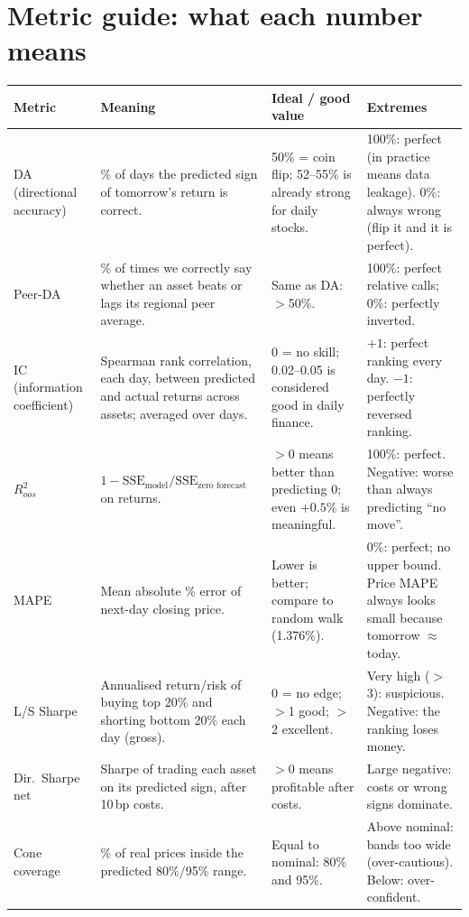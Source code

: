 \documentclass[10pt,a4paper]{article}
\begin{document}
\section{Metric guide: what each number means}
\begin{center}\footnotesize
\begin{tabularx}{\linewidth}{@{}p{2.1cm}Xp{3.0cm}X@{}}
\toprule
\textbf{Metric} & \textbf{Meaning} & \textbf{Ideal / good value} & \textbf{Extremes}\\\midrule
DA (directional accuracy) & \% of days the predicted sign of tomorrow's return is correct. & 50\% = coin flip; 52--55\% is already strong for daily stocks. & 100\%: perfect (in practice means data leakage). 0\%: always wrong (flip it and it is perfect).\\
Peer-DA & \% of times we correctly say whether an asset beats or lags its regional peer average. & Same as DA: $>$50\%. & 100\%: perfect relative calls; 0\%: perfectly inverted.\\
IC (information coefficient) & Spearman rank correlation, each day, between predicted and actual returns across assets; averaged over days. & 0 = no skill; 0.02--0.05 is considered good in daily finance. & $+1$: perfect ranking every day. $-1$: perfectly reversed ranking.\\
$R^2_{oos}$ & $1-\mathrm{SSE}_{\text{model}}/\mathrm{SSE}_{\text{zero forecast}}$ on returns. & $>0$ means better than predicting 0; even $+0.5$\% is meaningful. & 100\%: perfect. Negative: worse than always predicting ``no move''.\\
MAPE & Mean absolute \% error of next-day closing price. & Lower is better; compare to random walk (1.376\%). & 0\%: perfect; no upper bound. Price MAPE always looks small because tomorrow $\approx$ today.\\
L/S Sharpe & Annualised return/risk of buying top 20\% and shorting bottom 20\% each day (gross). & 0 = no edge; $>$1 good; $>$2 excellent. & Very high ($>$3): suspicious. Negative: the ranking loses money.\\
Dir.\ Sharpe net & Sharpe of trading each asset on its predicted sign, after 10\,bp costs. & $>$0 means profitable after costs. & Large negative: costs or wrong signs dominate.\\
Cone coverage & \% of real prices inside the predicted 80\%/95\% range. & Equal to nominal: 80\% and 95\%. & Above nominal: bands too wide (over-cautious). Below: over-confident.\\\bottomrule
\end{tabularx}
\end{center}
\end{document}

